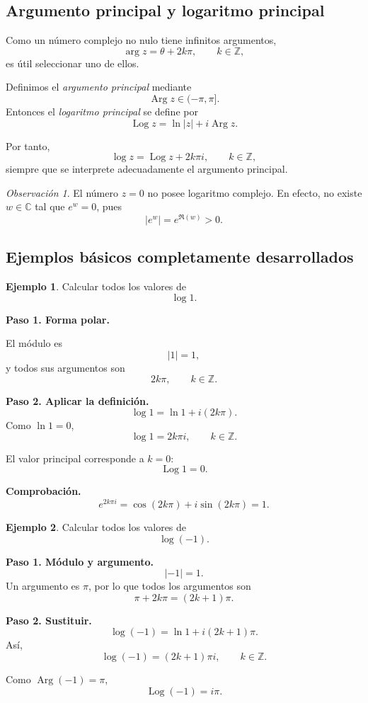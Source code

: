 \documentclass[12pt]{article}
\theoremstyle{definition}
\newtheorem{ejemplo}{Ejemplo}[section]
\theoremstyle{remark}
\newtheorem{observacion}{Observación}[section]
\begin{document}
\subsection{Argumento principal y logaritmo principal}

Como un número complejo no nulo tiene infinitos argumentos,
\[
\arg z=\theta+2k\pi,\qquad k\in\mathbb Z,
\]
es útil seleccionar uno de ellos.

Definimos el \emph{argumento principal} mediante
\[
\operatorname{Arg}z\in(-\pi,\pi].
\]
Entonces el \emph{logaritmo principal} se define por
\[
\boxed{
\operatorname{Log}z=\ln|z|+i\operatorname{Arg}z.
}
\]

Por tanto,
\[
\log z
=
\operatorname{Log}z+2k\pi i,
\qquad k\in\mathbb Z,
\]
siempre que se interprete adecuadamente el argumento principal.

\begin{observacion}
El número $z=0$ no posee logaritmo complejo. En efecto, no existe
$w\in\mathbb C$ tal que $e^w=0$, pues
\[
|e^w|=e^{\Re(w)}>0.
\]
\end{observacion}

\subsection{Ejemplos básicos completamente desarrollados}

\begin{ejemplo}
Calcular todos los valores de
\[
\log 1.
\]

\textbf{Paso 1. Forma polar.}

El módulo es
\[
|1|=1,
\]
y todos sus argumentos son
\[
2k\pi,\qquad k\in\mathbb Z.
\]

\textbf{Paso 2. Aplicar la definición.}
\[
\log1=\ln1+i(2k\pi).
\]
Como $\ln1=0$,
\[
\boxed{
\log1=2k\pi i,\qquad k\in\mathbb Z.
}
\]

El valor principal corresponde a $k=0$:
\[
\boxed{\operatorname{Log}1=0.}
\]

\textbf{Comprobación.}
\[
e^{2k\pi i}
=\cos(2k\pi)+i\sin(2k\pi)
=1.
\]
\end{ejemplo}

\begin{ejemplo}
Calcular todos los valores de
\[
\log(-1).
\]

\textbf{Paso 1. Módulo y argumento.}
\[
|-1|=1.
\]
Un argumento es $\pi$, por lo que todos los argumentos son
\[
\pi+2k\pi=(2k+1)\pi.
\]

\textbf{Paso 2. Sustituir.}
\[
\log(-1)
=\ln1+i(2k+1)\pi.
\]
Así,
\[
\boxed{
\log(-1)=(2k+1)\pi i,\qquad k\in\mathbb Z.
}
\]

Como $\operatorname{Arg}(-1)=\pi$,
\[
\boxed{\operatorname{Log}(-1)=i\pi.}
\]
\end{ejemplo}
\end{document}
